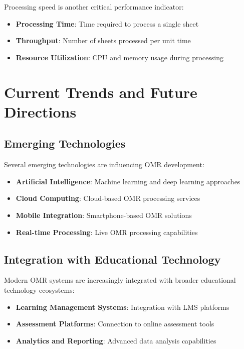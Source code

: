 Processing speed is another critical performance indicator:

\begin{itemize}
\item \textbf{Processing Time}: Time required to process a single sheet
\item \textbf{Throughput}: Number of sheets processed per unit time
\item \textbf{Resource Utilization}: CPU and memory usage during processing
\end{itemize}

\section{Current Trends and Future Directions}

\subsection{Emerging Technologies}

Several emerging technologies are influencing OMR development:

\begin{itemize}
\item \textbf{Artificial Intelligence}: Machine learning and deep learning approaches
\item \textbf{Cloud Computing}: Cloud-based OMR processing services
\item \textbf{Mobile Integration}: Smartphone-based OMR solutions
\item \textbf{Real-time Processing}: Live OMR processing capabilities
\end{itemize}

\subsection{Integration with Educational Technology}

Modern OMR systems are increasingly integrated with broader educational technology ecosystems:

\begin{itemize}
\item \textbf{Learning Management Systems}: Integration with LMS platforms
\item \textbf{Assessment Platforms}: Connection to online assessment tools
\item \textbf{Analytics and Reporting}: Advanced data analysis capabilities
\end{itemize}

